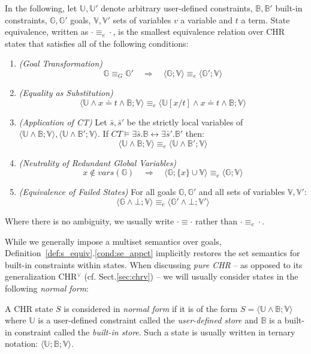 \documentclass[acmtocl]{acmtrans2m}
\newcommand\state[1]{\langle #1 \rangle}
\newcommand\subxt{\left[x/t\right]}
\newcommand\xet{\ensuremath{x\doteq t}}
\newcommand{\B}{\ensuremath{\mathbb{B}}}
\newcommand{\U}{\ensuremath{\mathbb{U}}}
\newcommand{\V}{\ensuremath{\mathbb{V}}}
\newcommand{\G}{\ensuremath{\mathbb{G}}}
\newcommand{\bs}{\bar{s}}
\begin{document}
\begin{definition}
\label{def:s_equiv}

In the following, let $\U,\U'$ denote arbitrary user-defined
constraints, $\B,\B'$ built-in constraints, $\G,\G'$
goals, $\V,\V'$ sets of variables $v$ a variable and $t$ a term.
State equivalence, written as $\cdot\equiv_e\cdot$, is the smallest
equivalence relation over CHR states that satisfies all of the following
conditions:

\begin{enumerate}
\item \label{cond:se_comm} \emph{(Goal Transformation)}
\[
\G\equiv_G\G'
\quad\Rightarrow\quad
\state{\G;\V} \equiv_e \state{\G';\V}
\]
\item \label{cond:se_subst} \emph{(Equality as Substitution)}
\[
\state{\U\wedge\xet\wedge\B;\V} \equiv_e \state{\U\subxt\wedge\xet\wedge\B;\V}
\]
\item \label{cond:se_appct} \emph{(Application of CT)} Let $\bs,\bs'$ be the strictly local variables of $\state{\U\wedge\B;\V}, \state{\U\wedge\B';\V}$. If
$CT\models\exists {\bar s}.\B \leftrightarrow\exists{\bar s}'.\B'$
then:
\[
\state{\U\wedge\B;\V} \equiv_e \state{\U\wedge\B';\V}
\]
\item \label{cond:se_global} \emph{(Neutrality of Redundant Global Variables)}
\[
x\not\in vars(\G)
\quad\Rightarrow\quad
\state{\G;\{x\}\cup\V} \equiv_e \state{\G;\V}
\]
\item \label{cond:se_fail} \emph{(Equivalence of Failed States)}
For all goals $\G,\G'$ and all sets of variables $\V,\V'$:
\[
\state{\G\wedge\bot;\V} \equiv_e \state{\G'\wedge\bot;\V'}
\]
\end{enumerate}
Where there is no ambiguity, we usually write $\cdot\equiv\cdot$ rather than
$\cdot\equiv_e\cdot$.
\end{definition}

While we generally impose a multiset semantics over goals,
Definition~\ref{def:s_equiv}.\ref{cond:se_appct} implicitly restores the set
semantics for built-in constraints within states. When discussing \emph{pure
CHR} -- as opposed to its generalization CHR$^\vee$ (cf. Sect.\ref{sec:chrv}) --
we will usually consider states in the following \emph{normal form}:

\begin{definition}
\label{def:ternary-state}
A CHR state $S$ is considered in \emph{normal form} if it is of the form
$S=\state{\U\wedge\B;\V}$ where $\U$ is a user-defined
constraint called the \emph{user-defined store} and $\B$ is a
built-in constraint called the \emph{built-in store}. Such a
state is usually written in ternary notation: $\state{\U;\B;\V}$.
\end{definition}
\end{document}
